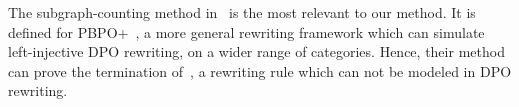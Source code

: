 The subgraph-counting method in~\cite{overbeek2024termination_lmcs} is the most relevant to our method. It is defined for PBPO+~\cite{overbeek2023graph}, a more general rewriting framework which can simulate left-injective DPO rewriting, on a wider range of categories. Hence, their method can prove the termination of~\cite[Examples 5.7]{overbeek2024termination_lmcs}, a rewriting rule which can not be modeled in DPO rewriting.
